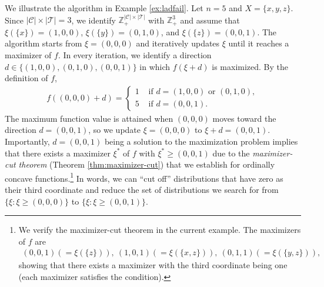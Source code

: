 \documentclass[12pt]{amsart}
\theoremstyle{remark}
\begin{document}
We illustrate the algorithm in Example \ref{ex:ladfail}. Let $n=5$ and $X=\{x,y,z\}$.
Since $|\mathcal{C}|\times |\mathcal{T}|=3$, we identify $\mathbb{Z}^{|\mathcal{C}|\times |\mathcal{T}|}_+$ with $\mathbb{Z}^3_+$
and assume that $\xi(\{x\})=(1,0,0)$, $\xi(\{y\})=(0,1,0)$, and $\xi(\{z\})=(0,0,1)$.
The algorithm starts from $\xi=(0,0,0)$ and iteratively updates $\xi$ until it reaches a maximizer of $f$.
In every iteration, we identify a direction $d \in \{(1,0,0), (0,1,0), (0,0,1)\}$ in which $f(\xi+d)$ is maximized.
By the definition of $f$,
\begin{align*}
f((0,0,0)+d)=\begin{cases} 1 & \text{ if } d=(1,0,0) \text{ or } (0,1,0), \\
                                   5 & \text{ if } d=(0,0,1).
                \end{cases}
\end{align*}
The maximum function value is attained when $(0,0,0)$ moves toward the direction $d=(0,0,1)$, so we update $\xi=(0,0,0)$ to $\xi+d=(0,0,1)$. Importantly, $d=(0,0,1)$ being a solution to the maximization problem implies that there exists a maximizer $\xi^*$ of $f$ with $\xi^*\geq (0,0,1)$ due to the {\it maximizer-cut theorem} (Theorem \ref{thm:maximizer-cut}) that we establish for ordinally concave functions.\footnote{We verify the maximizer-cut theorem in the current example. The maximizers of $f$ are
\begin{align*}
(0,0,1)(=\xi(\{z\})), \: (1,0,1)(=\xi(\{x,z\})), \: (0,1,1)(=\xi(\{y,z\})),
\end{align*}
showing that there exists a maximizer with the third coordinate being one (each maximizer satisfies the condition).}
In words, we can ``cut off''  distributions that have zero as their third coordinate
 and reduce the set of distributions we search
for from $\{\xi:\xi\geq (0,0,0)\}$ to $\{\xi:\xi\geq (0,0,1)\}$.


\end{document}
